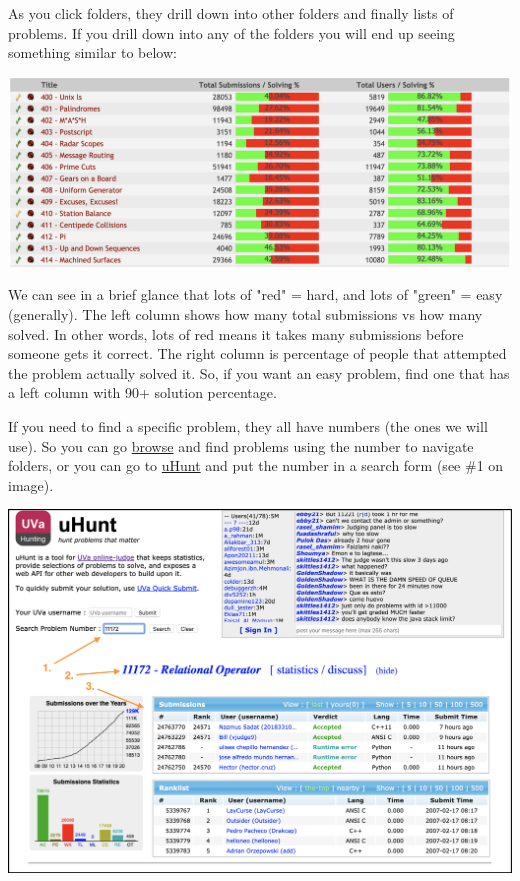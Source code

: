 
As you click folders, they drill down into other folders and finally lists of problems. If you drill down into any of the folders you will end up seeing something similar to below:

\begin{center}
\includegraphics[scale=.4]{images/problem_difficulty_sp_2020.png}
\end{center}


We can see in a brief glance that lots of "red" = hard, and lots of "green" = easy (generally). The left column shows how many total submissions vs how many solved. In other words, lots of red means it takes many submissions before someone gets it correct. The right column is percentage of people that attempted the problem actually solved it. So, if you want an easy problem, find one that has a left column with 90+ solution percentage.

If you need to find a specific problem, they all have numbers (the ones we will use). So you can go \href{https://onlinejudge.org/index.php?option=com_onlinejudge\&Itemid=8}{browse} and find problems using the number to navigate folders, or you can go to \href{https://uhunt.onlinejudge.org/}{uHunt} and put the number in a search form (see \#1 on image).

\begin{center}
\includegraphics[scale=.4]{images/uhunt_browse_problems.png}
\end{center}

